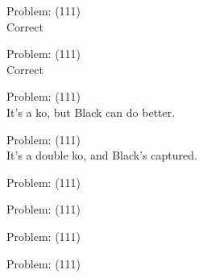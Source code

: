 \documentclass[11pt]{article}
\begin{document}
\begin{minipage}[t]{0.5\textwidth}
  {\centering
  
Problem: (111)\\
Correct\\
  }
\end{minipage}
\begin{minipage}[t]{0.5\textwidth}
  {\centering
  
Problem: (111)\\
Correct\\
  }
\end{minipage}
\begin{minipage}[t]{0.5\textwidth}
  {\centering
  
Problem: (111)\\
It's a ko, but Black can do better.\\
  }
\end{minipage}
\begin{minipage}[t]{0.5\textwidth}
  {\centering
  
Problem: (111)\\
It's a double ko, and Black's captured.\\
  }
\end{minipage}
\begin{minipage}[t]{0.5\textwidth}
  {\centering
  
Problem: (111)\\
  }
\end{minipage}
\begin{minipage}[t]{0.5\textwidth}
  {\centering
  
Problem: (111)\\
  }
\end{minipage}
\begin{minipage}[t]{0.5\textwidth}
  {\centering
  
Problem: (111)\\
  }
\end{minipage}
\begin{minipage}[t]{0.5\textwidth}
  {\centering
  
Problem: (111)\\
  }
\end{minipage}
\end{document}

